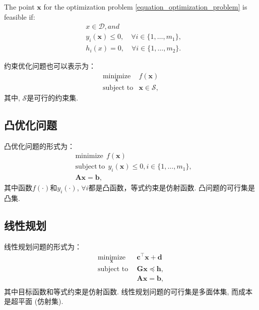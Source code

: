 \documentclass[lang=cn,10pt]{gorgeousnbook}
\numberwithin{equation}{section}%
\numberwithin{figure}{section}%
\begin{document}
\begin{definition}
	The point $\boldsymbol{x} $ for the optimization problem \eqref{equation_optimization_problem} is feasible if:
	\begin{equation}
	\begin{aligned}
		&x\in{\mathcal D},and \\
		&y_{i}(\boldsymbol{x})\leq0,\quad\forall i\in\{1,\ldots,m_{1}\}, \\
		&h_{i}(x)=0,\quad\forall i\in\{1,\ldots,m_{2}\}.
	\end{aligned}
	\end{equation}
\end{definition}

约束优化问题也可以表示为：
\begin{equation}
\begin{matrix}
	\underset{\boldsymbol{x}}{\text{minimize}}&f(\boldsymbol{x})\\\text{subject to}&\boldsymbol{x}\in\mathcal{S},
\end{matrix}
\end{equation}
其中, $\mathcal{S}$是可行的约束集. 
\subsection{凸优化问题}
凸优化问题的形式为：
\begin{equation}
\begin{aligned}
  &\mathrm{minimize} \ \ f(\boldsymbol{x})  \\
  &\mathrm{subject~to}\ \  y_{i}(\boldsymbol{x})\leq0,i\in\{1,\ldots,m_{1}\},  \\
  &\boldsymbol{Ax}=\boldsymbol{b},
  \end{aligned}
\end{equation}
其中函数$f(\cdot)$和$y_i(\cdot)$, $\forall i $都是凸函数，等式约束是仿射函数. 凸问题的可行集是凸集.
\subsection{线性规划}
线性规划问题的形式为：
\begin{equation}
\begin{matrix}\underset{\boldsymbol{x}}{\text{minimize}}& \boldsymbol{c}^{\top}\boldsymbol{x}+\boldsymbol{d}\\\text{subject to}\ \ &\boldsymbol{Gx}\preceq \boldsymbol{h},\\&\boldsymbol{Ax}=\boldsymbol{b},\\\end{matrix}
\end{equation}
其中目标函数和等式约束是仿射函数. 线性规划问题的可行集是多面体集, 而成本是超平面 (仿射集).
\end{document}
